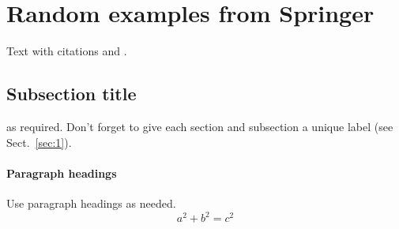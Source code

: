 
\section*{Random examples from Springer}


Text with citations \cite{RefB} and \cite{RefJ}.

\subsection{Subsection title}
\label{sec:2}
as required. Don't forget to give each section
and subsection a unique label (see Sect.~\ref{sec:1}).
\paragraph{Paragraph headings} Use paragraph headings as needed.
\begin{equation}
a^2+b^2=c^2
\end{equation}

